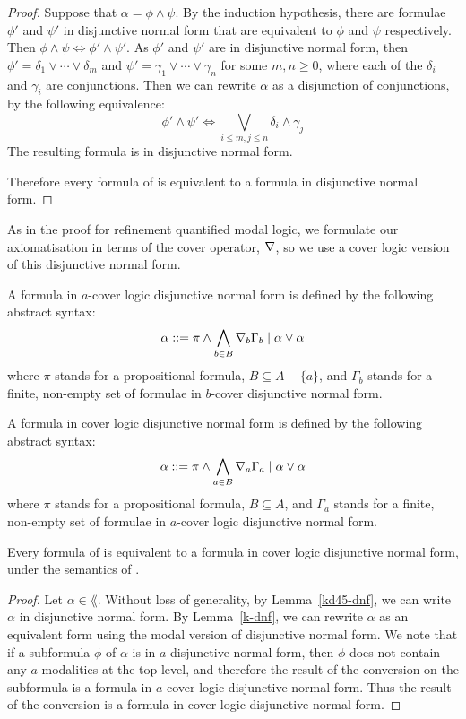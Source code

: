 \begin{proof}
Suppose that $\alpha = \phi \land \psi$. By the induction hypothesis, there are
formulae $\phi'$ and $\psi'$ in disjunctive normal form that are equivalent to
$\phi$ and $\psi$ respectively. Then $\phi \land \psi \iff \phi' \land \psi'$.
As $\phi'$ and $\psi'$ are in disjunctive normal form, then $\phi' = \delta_1
\lor \cdots \lor \delta_m$ and $\psi' = \gamma_1 \lor \cdots \lor \gamma_n$ for
some $m, n \geq 0$, where each of the $\delta_i$ and $\gamma_i$ are
conjunctions. Then we can rewrite $\alpha$ as a disjunction of conjunctions, by
the following equivalence:
$$
\phi' \land \psi' \iff \bigvee_{i \leq m, j \leq n} \delta_i \land \gamma_j
$$
The resulting formula is in disjunctive normal form.

Therefore every formula of \lang{} is equivalent to a formula in disjunctive
normal form.
\end{proof}

As in the proof for refinement quantified modal logic, we formulate our
axiomatisation in terms of the cover operator, $\nabla$, so we use a cover
logic version of this disjunctive normal form.

\begin{definition}
A formula in $a$-cover logic disjunctive normal form is defined by the following
abstract syntax:
$$
\alpha ::= \pi \land \bigwedge_{b \in B} \nabla_b \Gamma_b \mid
\alpha \lor \alpha
$$
where $\pi$ stands for a propositional formula, $B \subseteq A - \{a\}$, and
$\Gamma_b$ stands for a finite, non-empty set of formulae in $b$-cover
disjunctive normal form.

A formula in cover logic disjunctive normal form is defined by the following
abstract syntax:
$$
\alpha ::= \pi \land \bigwedge_{a \in B} \nabla_a \Gamma_a \mid
\alpha \lor \alpha
$$
where $\pi$ stands for a propositional formula, $B \subseteq A$, and $\Gamma_a$
stands for a finite, non-empty set of formulae in $a$-cover logic disjunctive normal
form.
\end{definition}

\begin{lemma}
Every formula of \lang{} is equivalent to a formula in cover logic disjunctive normal
form, under the semantics of \logicKD{}.
\end{lemma}

\begin{proof}
Let $\alpha \in \lang$. Without loss of generality, by Lemma~\ref{kd45-dnf}, we
can write $\alpha$ in disjunctive normal form. By Lemma~\ref{k-dnf}, we can
rewrite $\alpha$ as an equivalent form using the modal version of disjunctive
normal form. We note that if a subformula $\phi$ of $\alpha$ is in
$a$-disjunctive normal form, then $\phi$ does not contain any $a$-modalities at
the top level, and therefore the result of the conversion on the subformula is
a formula in $a$-cover logic disjunctive normal form. Thus the result of the
conversion is a formula in cover logic disjunctive normal form.
\end{proof}

